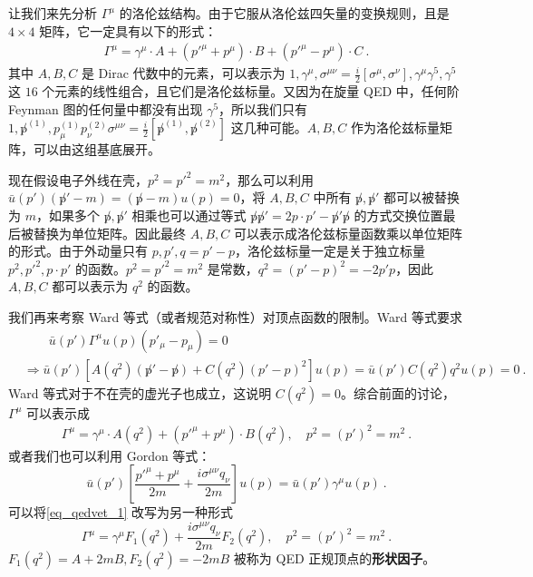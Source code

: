 让我们来先分析 $\Gamma^\mu$ 的洛伦兹结构。由于它服从洛伦兹四矢量的变换规则，且是 $4\times 4$ 矩阵，它一定具有以下的形式：
\begin{equation}
\begin{aligned}
\Gamma^\mu=\gamma^\mu\cdot A + ({p'}^\mu + p^\mu)\cdot B + ({p'}^\mu - p^\mu) \cdot C~.
\end{aligned}
\end{equation}
其中 $A,B,C$ 是 Dirac 代数中的元素，可以表示为 $1,\gamma^\mu,\sigma^{\mu\nu}=\frac{i}{2}[\sigma^\mu,\sigma^\nu],\gamma^\mu\gamma^5,\gamma^5$ 这 $16$ 个元素的线性组合，且它们是洛伦兹标量。又因为在旋量 QED 中，任何阶 Feynman 图的任何量中都没有出现 $\gamma^5$，所以我们只有 $1,\not p^{(1)},p_\mu^{(1)} p_\nu^{(2)} \sigma^{\mu\nu}=\frac{i}{2}[\not p^{(1)},\not p^{(2)}]$ 这几种可能。$A,B,C$ 作为洛伦兹标量矩阵，可以由这组基底展开。

现在假设电子外线在壳，$p^2=p'^2=m^2$，那么可以利用 $\bar u(p')(\not p'-m)= (\not p-m)u(p)=0$，将 $A,B,C$ 中所有 $\not p,\not p'$ 都可以被替换为 $m$，如果多个 $\not p,\not p'$ 相乘也可以通过等式 $\not p\not p'=2p\cdot p'-\not p'\not p$ 的方式交换位置最后被替换为单位矩阵。因此最终 $A,B,C$ 可以表示成洛伦兹标量函数乘以单位矩阵的形式。由于外动量只有 $p,p',q=p'-p$，洛伦兹标量一定是关于独立标量 $p^2,{p'}^2,p\cdot p'$ 的函数。$p^2={p'}^2=m^2$ 是常数，$q^2=(p'-p)^2 = -2p'p$，因此 $A,B,C$ 都可以表示为 $q^2$ 的函数。

我们再来考察 Ward 等式（或者规范对称性）对顶点函数的限制。Ward 等式要求
\begin{equation}
\begin{aligned}
&\qquad\bar u(p')\Gamma^\mu u(p) (p'_\mu-p_\mu) = 0\\
&\Rightarrow \bar u(p')\left[A(q^2)(\not p'-\not p)+ C(q^2)(p'-p)^2\right] u(p)=\bar u(p')C(q^2)q^2 u(p)=0~.
\end{aligned}
\end{equation}
Ward 等式对于不在壳的虚光子也成立，这说明 $C(q^2) = 0$。综合前面的讨论，$\Gamma^\mu$ 可以表示成
\begin{equation}\label{eq_qedvet_1}
\begin{aligned}
\Gamma^\mu = \gamma^\mu\cdot A(q^2) + ({p'}^\mu + p^\mu)\cdot B(q^2),\quad p^2=(p')^2=m^2~.
\end{aligned}
\end{equation}
或者我们也可以利用 Gordon 等式：
\begin{equation}
\bar u(p') \left[\frac{{p'}^\mu+p^\mu}{2m}+\frac{i\sigma^{\mu\nu}q_\nu}{2m}\right]u(p)=\bar u(p')\gamma^\mu u(p)~.
\end{equation}
可以将\autoref{eq_qedvet_1} 改写为另一种形式
\begin{equation}
\Gamma^\mu = \gamma^\mu F_1(q^2) + \frac{i\sigma^{\mu\nu}q_\nu}{2m} F_2(q^2),\quad p^2=(p')^2=m^2~.
\end{equation}
$F_1(q^2) = A+2mB,F_2(q^2)=-2mB$ 被称为 QED 正规顶点的\textbf{形状因子}。
